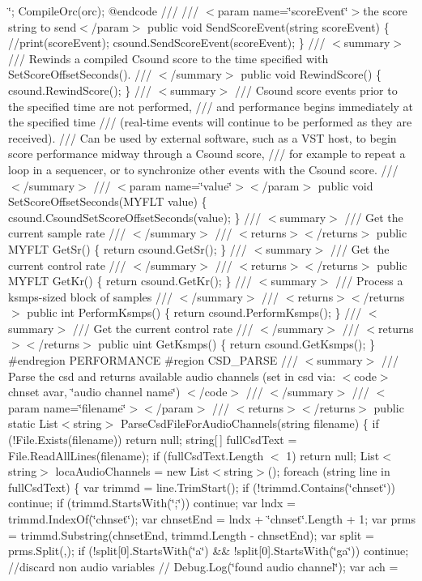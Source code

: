 \char`\"{}; \+Compile\+Orc(orc); @endcode   /// /// $<$param name=\char`\"{}score\+Event\char`\"{}$>$the score string to send$<$/param$>$ public void Send\+Score\+Event(string score\+Event) \{     //print(score\+Event);     csound.\+Send\+Score\+Event(score\+Event); \}  ///  $<$summary$>$ /// Rewinds a compiled Csound score to the time specified with Set\+Score\+Offset\+Seconds(). /// $<$/summary$>$ public void Rewind\+Score() \{     csound.\+Rewind\+Score(); \}  ///  $<$summary$>$ /// Csound score events prior to the specified time are not performed, /// and performance begins immediately at the specified time /// (real-\/time events will continue to be performed as they are received). /// Can be used by external software, such as a VST host, to begin score performance midway through a Csound score, /// for example to repeat a loop in a sequencer, or to synchronize other events with the Csound score. /// $<$/summary$>$ /// $<$param name=\char`\"{}value\char`\"{}$>$$<$/param$>$ public void Set\+Score\+Offset\+Seconds(\+MYFLT value) \{     csound.\+Csound\+Set\+Score\+Offset\+Seconds(value); \}  ///  $<$summary$>$ /// Get the current sample rate /// $<$/summary$>$ /// $<$returns$>$$<$/returns$>$ public MYFLT Get\+Sr() \{     return csound.\+Get\+Sr(); \}  ///  $<$summary$>$ /// Get the current control rate /// $<$/summary$>$ /// $<$returns$>$$<$/returns$>$ public MYFLT Get\+Kr() \{     return csound.\+Get\+Kr(); \}  ///  $<$summary$>$ /// Process a ksmps-\/sized block of samples /// $<$/summary$>$ /// $<$returns$>$$<$/returns$>$ public int Perform\+Ksmps() \{     return csound.\+Perform\+Ksmps(); \}  ///  $<$summary$>$ /// Get the current control rate /// $<$/summary$>$ /// $<$returns$>$$<$/returns$>$ public uint Get\+Ksmps() \{     return csound.\+Get\+Ksmps(); \}  \#endregion PERFORMANCE  \#region CSD\+\_\+\+PARSE  ///  $<$summary$>$ /// Parse the csd and returns available audio channels (set in csd via\+: $<$code$>$chnset avar, \char`\"{}audio channel name\char`\"{}) $<$/code$>$ /// $<$/summary$>$ /// $<$param name=\char`\"{}filename\char`\"{}$>$$<$/param$>$ /// $<$returns$>$$<$/returns$>$ public static List$<$string$>$ Parse\+Csd\+File\+For\+Audio\+Channels(string filename) \{     if (!\+File.\+Exists(filename)) return null;      string\mbox{[}$\,$\mbox{]} full\+Csd\+Text = File.\+Read\+All\+Lines(filename);     if (full\+Csd\+Text.\+Length $<$ 1) return null;      List$<$string$>$ loca\+Audio\+Channels = new List$<$string$>$();      foreach (string line in full\+Csd\+Text)     \{         var trimmd = line.\+Trim\+Start();         if (!trimmd.\+Contains(\char`\"{}chnset\char`\"{})) continue;         if (trimmd.\+Starts\+With(\char`\"{};\char`\"{})) continue;         var lndx = trimmd.\+Index\+Of(\char`\"{}chnset\char`\"{});         var chnset\+End = lndx + \char`\"{}chnset\char`\"{}.\+Length + 1;         var prms = trimmd.\+Substring(chnset\+End, trimmd.\+Length -\/ chnset\+End);         var split = prms.\+Split(\textquotesingle{},\textquotesingle{});         if (!split\mbox{[}0\mbox{]}.\+Starts\+With(\char`\"{}a\char`\"{}) \&\& !split\mbox{[}0\mbox{]}.\+Starts\+With(\char`\"{}ga\char`\"{}))             continue; //discard non audio variables         // Debug.\+Log(\char`\"{}found audio channel\char`\"{});         var ach = 